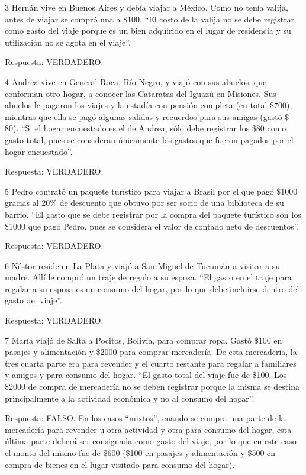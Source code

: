 \documentclass[
  openany]{book}
\begin{document}
3 Hernán vive en Buenos Aires y debía viajar a México. Como no tenía valija, antes de viajar se compró una a \$100.
``El costo de la valija no se debe registrar como gasto del viaje porque es un bien adquirido en el lugar de residencia y su utilización no se agota en el viaje''.

Respuesta: VERDADERO.

4 Andrea vive en General Roca, Río Negro, y viajó con sus abuelos, que conforman otro hogar, a conocer las Cataratas del Iguazú en Misiones. Sus abuelos le pagaron los viajes y la estadía con pensión completa (en total \$700), mientras que ella se pagó algunas salidas y recuerdos para sus amigas (gastó \$ 80).
``Si el hogar encuestado es el de Andrea, sólo debe registrar los \$80 como gasto total, pues se consideran únicamente los gastos que fueron pagados por el hogar encuestado''.

Respuesta: VERDADERO.

5 Pedro contrató un paquete turístico para viajar a Brasil por el que pagó \$1000 gracias al 20\% de descuento que obtuvo por ser socio de una biblioteca de su barrio.
``El gasto que se debe registrar por la compra del paquete turístico son los \$1000 que pagó Pedro, pues se considera el valor de contado neto de descuentos''.

Respuesta: VERDADERO.

6 Néstor reside en La Plata y viajó a San Miguel de Tucumán a visitar a su madre. Allí le compró un traje de regalo a su esposa.
``El gasto en el traje para regalar a su esposa es un consumo del hogar, por lo que debe incluirse dentro del gasto del viaje''.

Respuesta: VERDADERO.

7 María viajó de Salta a Pocitos, Bolivia, para comprar ropa. Gastó \$100 en pasajes y alimentación y \$2000 para comprar mercadería. De esta mercadería, la tres cuarta parte era para revender y el cuarto restante para regalar a familiares y amigos y para consumo del hogar.
``El gasto total del viaje fue de \$100. Los \$2000 de compra de mercadería no se deben registrar porque la misma se destina principalmente a la actividad económica y no al consumo del hogar''.

Respuesta: FALSO. En los casos ``mixtos'', cuando se compra una parte de la mercadería para revender u otra actividad y otra para consumo del hogar, esta última parte deberá ser consignada como gasto del viaje, por lo que en este caso el monto del mismo fue de \$600 (\$100 en pasajes y alimentación y \$500 en compra de bienes en el lugar visitado para consumo del hogar).
\end{document}
